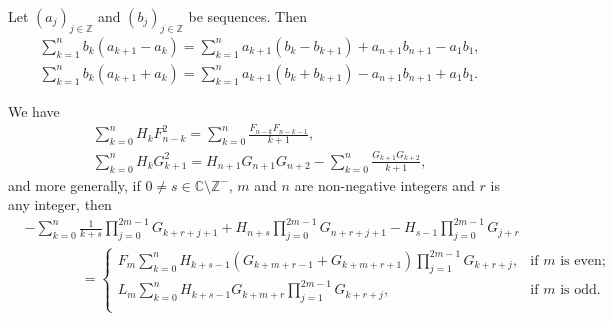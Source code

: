 \documentclass[10pt,a4paper]{amsart}
\begin{document}
	\begin{lemma}
		Let ${(a_j)}_{j\in\mathbb Z}$ and ${(b_j)}_{j\in\mathbb Z}$ be sequences. Then
		\begin{gather}
			\sum_{k = 1}^n b_k (a_{k + 1} - a_k) = \sum_{k = 1}^n a_{k + 1} (b_k - b_{k + 1}) + a_{n + 1} b_{n + 1} - a_1 b_1, \label{abel1} \\
			\sum_{k = 1}^n b_k (a_{k + 1} + a_k) = \sum_{k = 1}^n a_{k + 1} (b_k + b_{k + 1}) - a_{n + 1} b_{n + 1} + a_1 b_1. \label{abel2}
		\end{gather}
	\end{lemma}

	\begin{theorem}
		We have
		\begin{gather}
		\sum_{k = 0}^n {H_k F_{n - k}^2 } = \sum_{k = 0}^n {\frac{{F_{n - k} F_{n - k - 1} }}{{k + 1}}},\\
		\sum_{k = 0}^n {H_k G_{k + 1}^2 } = H_{n + 1} G_{n + 1} G_{n + 2} - \sum_{k = 0}^n {\frac{{G_{k + 1} G_{k + 2} }}{{k + 1}}},
		\end{gather}
		and more generally, if $0\ne s\in\mathbb C\setminus\mathbb Z^{-}$, $m$ and $n$ are non-negative integers and $r$ is any integer, then
		\begin{equation}\label{eq.g8er2qv}
		\begin{split}
		& - \sum_{k = 0}^n {\frac{1}{{k + s}}\prod_{j = 0}^{2m - 1} {G_{k + r + j + 1} } } + H_{n + s} \prod_{j = 0}^{2m - 1} {G_{n + r + j + 1} }  - H_{s - 1} \prod_{j = 0}^{2m - 1} {G_{j + r} } \\
		&\qquad\qquad =
		\begin{cases}
		F_m \sum_{k = 0}^n {H_{k + s - 1} \left( {G_{k + m + r - 1}  + G_{k + m + r + 1} } \right)\prod_{j = 1}^{2m - 1} {G_{k + r + j} } },&\text{if $m$ is even;}  \\
		L_m \sum_{k = 0}^n {H_{k + s - 1} G_{k + m + r} \prod_{j = 1}^{2m - 1} {G_{k + r + j} } },&\text{if $m$ is odd.}  \\
		\end{cases}
		\end{split}
		\end{equation}
	\end{theorem}
\end{document}
